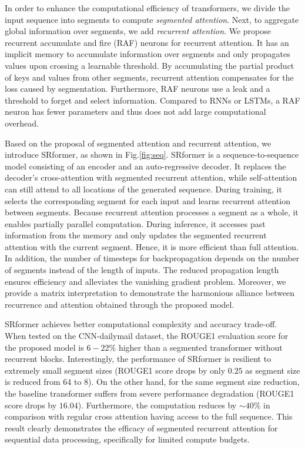 \documentclass[11pt]{article}
\begin{document}
In order to enhance the computational efficiency of transformers, we divide the input sequence into segments to compute \textit{segmented attention}. Next, to aggregate global information over segments, we add \textit{recurrent attention}. We propose recurrent accumulate and fire (RAF) neurons for recurrent attention. It has an implicit memory to accumulate information over segments and only propagates values upon crossing a learnable threshold. By accumulating the partial product of keys and values from other segments, recurrent attention compensates for the loss caused by segmentation. Furthermore, RAF neurons use a leak and a threshold to forget and select information. 
Compared to RNNs or LSTMs, a RAF neuron has fewer parameters and thus does not add large computational overhead.   

Based on the proposal of segmented attention and recurrent attention, we introduce SRformer, as shown in Fig.\ref{fig:seq}. SRformer is a sequence-to-sequence model consisting of an encoder and an auto-regressive decoder. It replaces the decoder's cross-attention with segmented recurrent attention, while self-attention can still attend to all locations of the generated sequence. During training, it selects the corresponding segment for each input and learns recurrent attention between segments. Because recurrent attention processes a segment as a whole, it enables partially parallel computation.
During inference, it accesses past information from the memory and only updates the segmented recurrent attention with the current segment. Hence, it is more efficient than full attention. In addition, the number of timesteps for backpropagation depends on the number of segments instead of the length of inputs. The reduced propagation length ensures efficiency and alleviates the vanishing gradient problem. Moreover, we provide a matrix interpretation to demonstrate the harmonious alliance between recurrence and attention obtained through the proposed model.

SRformer achieves better computational complexity and accuracy trade-off. When tested on the CNN-dailymail dataset, the ROUGE1 evaluation score for the proposed model is $6-22\%$ higher than a segmented transformer without recurrent blocks. Interestingly, the performance of SRformer is resilient to extremely small segment sizes (ROUGE1 score drops by only $0.25$ as segment size is reduced from 64 to 8). On the other hand, for the same segment size reduction, the baseline transformer suffers from severe performance degradation (ROUGE1 score drops  by $16.04$). Furthermore, the computation reduces by $\sim40\%$ in comparison with regular cross attention having access to the full sequence. This result clearly demonstrates the efficacy of segmented recurrent attention for sequential data processing, specifically for limited compute budgets.
\end{document}

